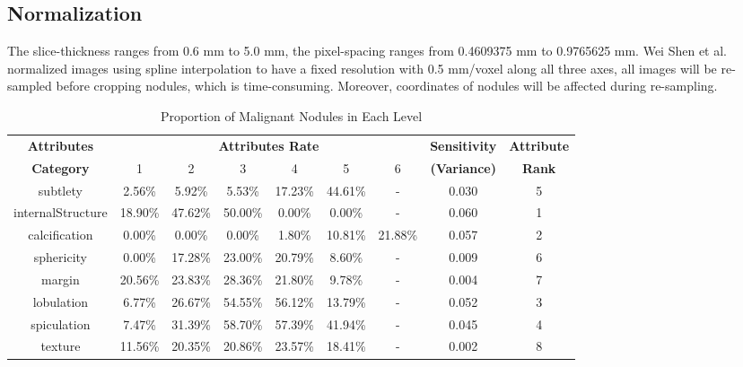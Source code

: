 \documentclass{article}
\begin{document}
\subsection{Normalization}
\vspace{-0.1cm}
The slice-thickness ranges from 0.6 mm to 5.0 mm, the pixel-spacing ranges from 0.4609375 mm to 0.9765625 mm. Wei Shen et al. \cite{Shen2017Multi} normalized images using spline interpolation to have a fixed resolution with 0.5 mm/voxel along all three axes, all images will be re-sampled before cropping nodules, which is time-consuming. Moreover, coordinates of nodules will be affected during re-sampling.
\begin{table}[*t]
\setlength{\abovecaptionskip}{0.cm}
\setlength{\belowcaptionskip}{-0.cm}
\caption{Proportion of Malignant Nodules in Each Level}
\begin{center}
\begin{tabular}{|c|c|c|c|c|c|c|c|c|}
\hline
\textbf{Attributes}&\multicolumn{6}{|c|}{\textbf{Attributes Rate}} & \textbf{Sensitivity}&\textbf{Attribute}\\
\cline{2-7}
\textbf{Category}& 1&2&3&4&5&6& \textbf{(Variance)}&\textbf{Rank} \\
\hline
subtlety& 2.56\% &5.92\% & 5.53\% & 17.23\% & 44.61\% & - & 0.030&5\\
internalStructure& 18.90\% & 47.62\% & 50.00\% & 0.00\% & 0.00\% & - &0.060&1\\
calcification& 0.00\% &0.00\% & 0.00\% & 1.80\% & 10.81\% & 21.88\% & 0.057&2 \\
sphericity& 0.00\% & 17.28\% & 23.00\% & 20.79\% & 8.60\% & - &0.009&6\\
margin& 20.56\% & 23.83\% & 28.36\% & 21.80\% & 9.78\% & - &0.004&7\\
lobulation& 6.77\% & 26.67\% & 54.55\% & 56.12\% & 13.79\% & - &0.052&3\\
spiculation& 7.47\% & 31.39\% & 58.70\% & 57.39\% & 41.94\% & -&0.045& 4\\
texture& 11.56\% & 20.35\% & 20.86\% & 23.57\% & 18.41\% & - &0.002&8\\
\hline
\end{tabular}
\label{tab2}
\vspace{-0.5cm}
\end{center}
\end{table}
\end{document}
